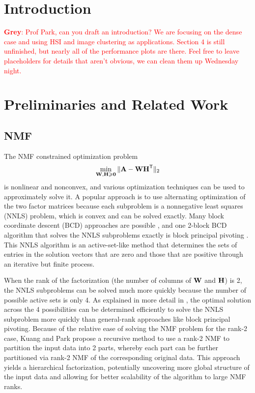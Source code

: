 \documentclass[conference,compsoc]{IEEEtran}
\newcommand{\GB}[1]{\textcolor{red}{\textbf{Grey}: #1}}
\begin{document}

\section{Introduction}

\GB{Prof Park, can you draft an introduction?  We are focusing on the dense case and using HSI and image clustering as applications.  Section 4 is still unfinished, but nearly all of the performance plots are there.  Feel free to leave placeholders for details that aren't obvious, we can clean them up Wednesday night.}

\section{Preliminaries and Related Work}
\label{sec:prelim}

\subsection{NMF}

The NMF constrained optimization problem
$$\min_{\M{W},\M{H}\geq \M{0}} \|\M{A} - \M{W}\M{H}^\Tra\|_2$$
is nonlinear and nonconvex, and various optimization techniques can be used to approximately solve it.
A popular approach is to use alternating optimization of the two factor matrices because each subproblem is a nonnegative least squares (NNLS) problem, which is convex and can be solved exactly.
Many block coordinate descent (BCD) approaches are possible \cite{KHP14}, and one 2-block BCD algorithm that solves the NNLS subproblems exactly is block principal pivoting \cite{KP11}.
This NNLS algorithm is an active-set-like method that determines the sets of entries in the solution vectors that are zero and those that are positive through an iterative but finite process.

When the rank of the factorization (the number of columns of $\M{W}$ and $\M{H}$) is 2, the NNLS subproblems can be solved much more quickly because the number of possible active sets is only 4.
As explained in more detail in , the optimal solution across the 4 possibilities can be determined efficiently to solve the NNLS subproblem more quickly than general-rank approaches like block principal pivoting.
Because of the relative ease of solving the NMF problem for the rank-2 case, Kuang and Park \cite{KP13} propose a recursive method to use a rank-2 NMF to partition the input data into 2 parts, whereby each part can be further partitioned via rank-2 NMF of the corresponding original data.
This approach yields a hierarchical factorization, potentially uncovering more global structure of the input data and allowing for better scalability of the algorithm to large NMF ranks.
\end{document}

